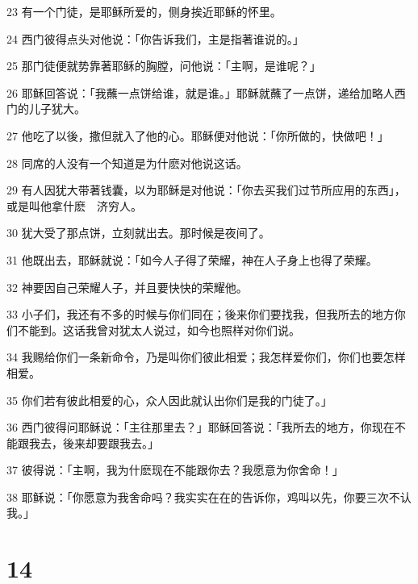 \par 23 有一个门徒，是耶稣所爱的，侧身挨近耶稣的怀里。
\par 24 西门彼得点头对他说：「你告诉我们，主是指著谁说的。」
\par 25 那门徒便就势靠著耶稣的胸膛，问他说：「主啊，是谁呢？」
\par 26 耶稣回答说：「我蘸一点饼给谁，就是谁。」耶稣就蘸了一点饼，递给加略人西门的儿子犹大。
\par 27 他吃了以後，撒但就入了他的心。耶稣便对他说：「你所做的，快做吧！」
\par 28 同席的人没有一个知道是为什麽对他说这话。
\par 29 有人因犹大带著钱囊，以为耶稣是对他说：「你去买我们过节所应用的东西」，或是叫他拿什麽　济穷人。
\par 30 犹大受了那点饼，立刻就出去。那时候是夜间了。
\par 31 他既出去，耶稣就说：「如今人子得了荣耀，神在人子身上也得了荣耀。
\par 32 神要因自己荣耀人子，并且要快快的荣耀他。
\par 33 小子们，我还有不多的时候与你们同在；後来你们要找我，但我所去的地方你们不能到。这话我曾对犹太人说过，如今也照样对你们说。
\par 34 我赐给你们一条新命令，乃是叫你们彼此相爱；我怎样爱你们，你们也要怎样相爱。
\par 35 你们若有彼此相爱的心，众人因此就认出你们是我的门徒了。」
\par 36 西门彼得问耶稣说：「主往那里去？」耶稣回答说：「我所去的地方，你现在不能跟我去，後来却要跟我去。」
\par 37 彼得说：「主啊，我为什麽现在不能跟你去？我愿意为你舍命！」
\par 38 耶稣说：「你愿意为我舍命吗？我实实在在的告诉你，鸡叫以先，你要三次不认我。」

\chapter{14}

